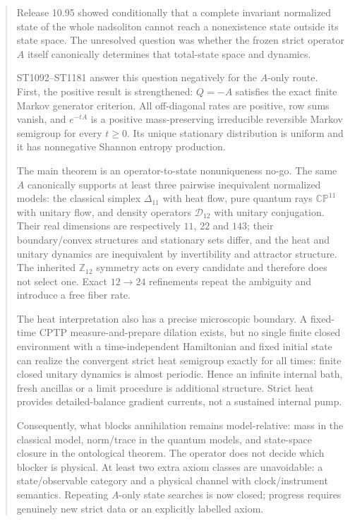 \documentclass[11pt,a4paper]{article}
\newcommand{\Dclass}{\Delta_{11}}
\newcommand{\Drho}{\mathcal D_{12}}
\begin{document}
\begin{abstract}
Release 10.95 showed conditionally that a complete invariant normalized state
of the whole nadsoliton cannot reach a nonexistence state outside its state
space.  The unresolved question was whether the frozen strict operator $A$
itself canonically determines that total-state space and dynamics.

ST1092--ST1181 answer this question negatively for the $A$-only route.  First,
the positive result is strengthened: $Q=-A$ satisfies the exact finite Markov
generator criterion.  All off-diagonal rates are positive, row sums vanish,
and $e^{-tA}$ is a positive mass-preserving irreducible reversible Markov
semigroup for every $t\ge0$.  Its unique stationary distribution is uniform
and it has nonnegative Shannon entropy production.

The main theorem is an operator-to-state nonuniqueness no-go.  The same $A$
canonically supports at least three pairwise inequivalent normalized models:
the classical simplex $\Dclass$ with heat flow, pure quantum rays
$\mathbb{CP}^{11}$ with unitary flow, and density operators $\Drho$ with
unitary conjugation.  Their real dimensions are respectively $11$, $22$ and
$143$; their boundary/convex structures and stationary sets differ, and the
heat and unitary dynamics are inequivalent by invertibility and attractor
structure.  The inherited $\mathbb Z_{12}$ symmetry acts on every candidate
and therefore does not select one.  Exact $12\to24$ refinements repeat the
ambiguity and introduce a free fiber rate.

The heat interpretation also has a precise microscopic boundary.  A fixed-
time CPTP measure-and-prepare dilation exists, but no single finite closed
environment with a time-independent Hamiltonian and fixed initial state can
realize the convergent strict heat semigroup exactly for all times: finite
closed unitary dynamics is almost periodic.  Hence an infinite internal bath,
fresh ancillas or a limit procedure is additional structure.  Strict heat
provides detailed-balance gradient currents, not a sustained internal pump.

Consequently, what blocks annihilation remains model-relative: mass in the
classical model, norm/trace in the quantum models, and state-space closure in
the ontological theorem.  The operator does not decide which blocker is
physical.  At least two extra axiom classes are unavoidable: a state/observable
category and a physical channel with clock/instrument semantics.  Repeating
$A$-only state searches is now closed; progress requires genuinely new strict
data or an explicitly labelled axiom.
\end{abstract}
\end{document}
